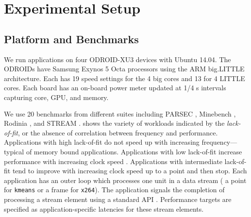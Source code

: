 \section{Experimental Setup}

\subsection{Platform and Benchmarks}
We run applications on four ODROID-XU3 devices with Ubuntu
14.04. The ODROIDs have
Samsung Exynos 5 Octa processors using the ARM big.LITTLE
architecture.  Each has 19 speed settings for the 4 big cores and 13
for 4 LITTLE cores.  Each board has an on-board power meter updated at
1/4 s intervals capturing core, GPU, and memory.

We use 20 benchmarks from different suites including PARSEC
\cite{parsec}, Minebench \cite{minebench}, Rodinia \cite{rodinia}, and
STREAM \cite{stream}.  shows the
variety of workloads indicated by the \emph{lack-of-fit}, or the
absence of correlation between frequency and performance.
Applications with high lack-of-fit do not speed up with increasing
frequency---typical of memory bound applications. Applications with
low lack-of-fit increase performance with increasing clock speed
\cite{powerslope}.  Applications with intermediate lack-of-fit tend to
improve with increasing clock speed up to a point and then stop.  Each
application has an outer loop which processes one unit in a data
stream (\eg{} a point for \texttt{kmeans} or a frame for
\texttt{x264}). The application signals the completion of processing a
stream element using a standard API \cite{icac2010heartbeats}.
Performance targets are specified as application-specific latencies
for these stream elements.



